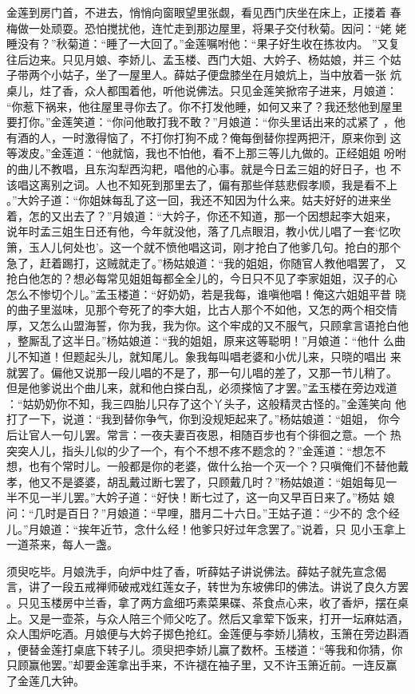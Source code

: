 金莲到房门首，不进去，悄悄向窗眼望里张觑，看见西门庆坐在床上，正搂着
春梅做一处顽耍。恐怕搅扰他，连忙走到那边屋里，将果子交付秋菊。因问：“姥
姥睡没有？”秋菊道：“睡了一大回了。”金莲嘱咐他：“果子好生收在拣妆内。
”又复往后边来。只见月娘、李娇儿、孟玉楼、西门大姐、大妗子、杨姑娘，并三
个姑子带两个小姑子，坐了一屋里人。薛姑子便盘膝坐在月娘炕上，当中放着一张
炕桌儿，炷了香，众人都围着他，听他说佛法。只见金莲笑掀帘子进来，月娘道：
“你惹下祸来，他往屋里寻你去了。你不打发他睡，如何又来了？我还愁他到屋里
要打你。”金莲笑道：“你问他敢打我不敢？”月娘道：“你头里话出来的忒紧了
，他有酒的人，一时激得恼了，不打你打狗不成？俺每倒替你捏两把汗，原来你到
这等泼皮。”金莲道：“他就恼，我也不怕他，看不上那三等儿九做的。正经姐姐
吩咐的曲儿不教唱，且东沟犁西沟耙，唱他的心事。就是今日孟三姐的好日子，也
不该唱这离别之词。人也不知死到那里去了，偏有那些佯慈悲假孝顺，我是看不上
。”大妗子道：“你姐妹每乱了这一回，我还不知因为什么来。姑夫好好的进来坐
着，怎的又出去了？”月娘道：“大妗子，你还不知道，那一个因想起李大姐来，
说年时孟三姐生日还有他，今年就没他，落了几点眼泪，教小优儿唱了一套‘忆吹
箫，玉人儿何处也’。这一个就不愤他唱这词，刚才抢白了他爹几句。抢白的那个
急了，赶着踢打，这贼就走了。”杨姑娘道：“我的姐姐，你随官人教他唱罢了，
又抢白他怎的？想必每常见姐姐每都全全儿的，今日只不见了李家姐姐，汉子的心
怎么不惨切个儿。”孟玉楼道：“好奶奶，若是我每，谁嗔他唱！俺这六姐姐平昔
晓的曲子里滋味，见那个夸死了的李大姐，比古人那个不如他，又怎的两个相交情
厚，又怎么山盟海誓，你为我，我为你。这个牢成的又不服气，只顾拿言语抢白他
，整厮乱了这半日。”杨姑娘道：“我的姐姐，原来这等聪明！”月娘道：“他什
么曲儿不知道！但题起头儿，就知尾儿。象我每叫唱老婆和小优儿来，只晓的唱出
来就罢了。偏他又说那一段儿唱的不是了，那一句儿唱的差了，又那一节儿稍了。
但是他爹说出个曲儿来，就和他白搽白乱，必须搽恼了才罢。”孟玉楼在旁边戏道
：“姑奶奶你不知，我三四胎儿只存了这个丫头子，这般精灵古怪的。”金莲笑向
他打了一下，说道：“我到替你争气，你到没规矩起来了。”杨姑娘道：“姐姐，
你今后让官人一句儿罢。常言：一夜夫妻百夜恩，相随百步也有个徘徊之意。一个
热突突人儿，指头儿似的少了一个，有个不想不疼不题念的？”金莲道：“想怎不
想，也有个常时儿。一般都是你的老婆，做什么抬一个灭一个？只嗔俺们不替他戴
孝，他又不是婆婆，胡乱戴过断七罢了，只顾戴几时？”杨姑娘道：“姐姐每见一
半不见一半儿罢。”大妗子道：“好快！断七过了，这一向又早百日来了。”杨姑
娘问：“几时是百日？”月娘道：“早哩，腊月二十六日。”王姑子道：“少不的
念个经儿。”月娘道：“挨年近节，念什么经！他爹只好过年念罢了。”说着，只
见小玉拿上一道茶来，每人一盏。

须臾吃毕。月娘洗手，向炉中炷了香，听薛姑子讲说佛法。薛姑子就先宣念偈
言，讲了一段五戒禅师破戒戏红莲女子，转世为东坡佛印的佛法。讲说了良久方罢
。只见玉楼房中兰香，拿了两方盒细巧素菜果碟、茶食点心来，收了香炉，摆在桌
上。又是一壶茶，与众人陪三个师父吃了。然后又拿荤下饭来，打开一坛麻姑酒，
众人围炉吃酒。月娘便与大妗子掷色抢红。金莲便与李娇儿猜枚，玉箫在旁边斟酒
，便替金莲打桌底下转子儿。须臾把李娇儿赢了数杯。玉楼道：“等我和你猜，你
只顾赢他罢。”却要金莲拿出手来，不许褪在袖子里，又不许玉箫近前。一连反赢
了金莲几大钟。

